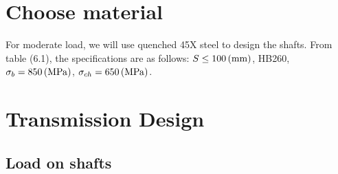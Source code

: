 
\section{Choose material}
For moderate load, we will use quenched 45X steel to design the shafts. From table (6.1), the specifications are as follows: $ S \leq 100\, (\mathrm{mm}) $, HB260, $ \sigma_b = 850\, (\mathrm{MPa})$, $ \sigma_{ch} = 650\, (\mathrm{MPa})$. 

\section{Transmission Design}
\subsection{Load on shafts}
